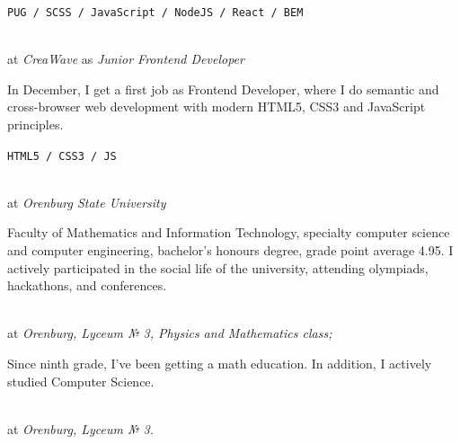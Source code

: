 \texttt{PUG / SCSS / JavaScript / NodeJS / React / BEM }
\SmallSep

 \\
at \textit{CreaWave}
as \textit{Junior Frontend Developer}
\SmallSep

In December, I get a first job as Frontend Developer, where I do semantic and cross-browser web development with modern HTML5,  CSS3 and JavaScript principles.
\SmallSep

\texttt{HTML5 / CSS3 / JS}

\clearpage
\framebreak
\framebreak



 \\
at \textit {Orenburg State University}

\SmallSep

Faculty of Mathematics and Information Technology, specialty computer science and computer engineering,  bachelor's honours degree, grade point average 4.95. I actively participated in the social life of the university, attending olympiads, hackathons, and conferences.

\SmallSep

 \\
at \textit {Orenburg, Lyceum № 3, Physics and Mathematics class;}
\SmallSep

Since ninth grade, I've been getting a math education. In addition, I actively studied Computer Science.

\SmallSep

 \\
at \textit {Orenburg, Lyceum № 3.}

\Sep



